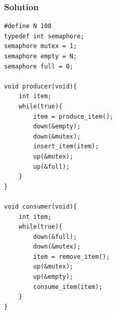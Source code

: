 \documentclass[12pt]{article}
\begin{document}
\subsubsection{Solution}
\begin{lstlisting}
#define N 100
typedef int semaphore;
semaphore mutex = 1;
semaphore empty = N;
semaphore full = 0;

void producer(void){
    int item;
    while(true){
        item = produce_item();
        down(&empty);
        down(&mutex);
        insert_item(item);
        up(&mutex);
        up(&full);
    }
}

void consumer(void){
    int item;
    while(true){
        down(&full);
        down(&mutex);
        item = remove_item();
        up(&mutex);
        up(&empty);
        consume_item(item);
    }
}
\end{lstlisting}
\end{document}
